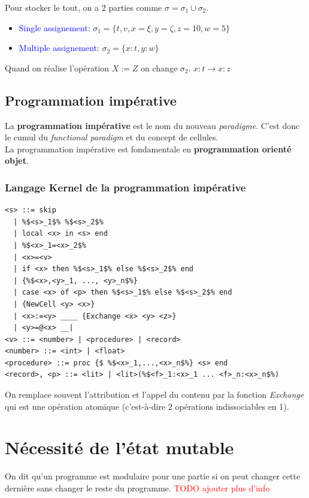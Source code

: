 \documentclass{report}
\begin{document}
Pour stocker le tout, on a 2 parties comme $\sigma = \sigma_1 \cup \sigma_2$.
\begin{itemize}
\item \textcolor{blue}{Single assignement}: $\sigma_1 = \{t,v,x=\xi,y = \zeta , z = 10, w = 5 \}$
\item \textcolor{blue}{Multiple assignement}: $\sigma_2 = \{x:t, y:w\}$
\end{itemize}
Quand on réalise l'opération $X:=Z$ on change $\sigma_2$. $x:t \rightarrow x:z$

\subsection{Programmation impérative}
La \textbf{programmation impérative} est le nom du nouveau \textit{paradigme}. C'est donc le cumul du \textit{functional paradigm} et du concept de cellules.\\
La programmation impérative est fondamentale en \textbf{programmation orienté objet}.

\subsubsection{Langage Kernel de la programmation impérative}
\begin{lstlisting}[escapechar=\%]
<s> ::= skip 
  | %$<s>_1$% %$<s>_2$% 
  | local <x> in <s> end 
  | %$<x>_1=<x>_2$%
  | <x>=<v> 
  | if <x> then %$<s>_1$% else %$<s>_2$% end 
  | {%$<x>,<y>_1, ..., <y>_n$%} 
  | case <x> of <p> then %$<s>_1$% else %$<s>_2$% end 
  | {NewCell <y> <x>} 
  | <x>:=<y> ____ {Exchange <x> <y> <z>}
  | <y>=@<x> __|
<v> ::= <number> | <procedure> | <record> 
<number> ::= <int> | <float> 
<procedure> ::= proc {$ %$<x>_1,...,<x>_n$%} <s> end
<record>, <p> ::= <lit> | <lit>(%$<f>_1:<x>_1 ... <f>_n:<x>_n$%)
\end{lstlisting}
On remplace souvent l'attribution et l'appel du contenu par la fonction \textit{Exchange} qui est une opération atomique (c'est-à-dire 2 opérations indissociables en 1).

\section{Nécessité de l'état mutable}
On dit qu'un programme est modulaire pour une partie si on peut changer cette dernière sans changer le reste du programme.
\textcolor{red}{TODO ajouter plus d'info}
\end{document}
